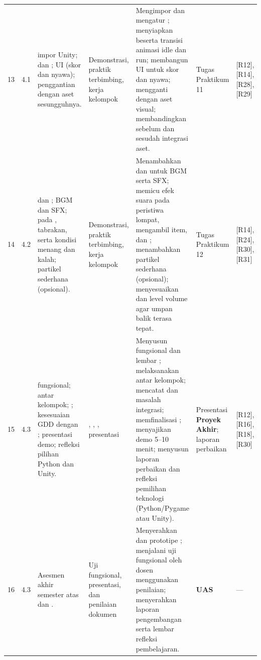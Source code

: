 \begin{landscape}
{\begin{longtable}{@{}L{1.0cm} L{2.0cm} L{4.2cm} L{3.0cm} L{7.8cm} L{3.4cm} L{2.0cm}@{}}
13 & 4.1 &
 impor Unity;  dan ;  UI (skor dan nyawa); penggantian  dengan aset sesungguhnya. &
Demonstrasi, praktik terbimbing, kerja kelompok &
Mengimpor  dan mengatur ; menyiapkan  beserta transisi animasi idle dan run; membangun UI  untuk skor dan nyawa; mengganti  dengan aset visual; membandingkan  sebelum dan sesudah integrasi aset. &
Tugas Praktikum 11 & [R12], [R14], [R28], [R29] \\
\addlinespace

14 & 4.2 &
 dan ; BGM dan SFX;  pada , tabrakan, serta kondisi menang dan kalah; partikel sederhana (opsional). &
Demonstrasi, praktik terbimbing, kerja kelompok &
Menambahkan  dan  untuk BGM serta SFX; memicu efek suara pada peristiwa lompat, mengambil item, dan ; menambahkan partikel sederhana (opsional); menyesuaikan  dan level volume agar umpan balik terasa tepat. &
Tugas Praktikum 12 & [R14], [R24], [R30], [R31] \\
\addlinespace

15 & 4.3 &
 fungsional;  antar kelompok; ; kesesuaian GDD dengan ; presentasi demo; refleksi pilihan Python dan Unity. &
, , , presentasi &
Menyusun  fungsional dan lembar ; melaksanakan  antar kelompok; mencatat  dan masalah integrasi; memfinalisasi ; menyajikan demo 5--10 menit; menyusun laporan perbaikan dan refleksi pemilihan teknologi (Python/Pygame atau Unity). &
Presentasi \textbf{Proyek Akhir}; laporan perbaikan & [R12], [R16], [R18], [R30] \\
\addlinespace

16 & 4.3 &
Asesmen akhir semester atas  dan . &
Uji fungsional, presentasi, dan penilaian dokumen &
Menyerahkan  dan  prototipe ; menjalani uji fungsional oleh dosen menggunakan  penilaian; menyerahkan laporan pengembangan serta lembar refleksi pembelajaran. &
\textbf{UAS} & --- \\

\end{longtable}}
\end{landscape}

